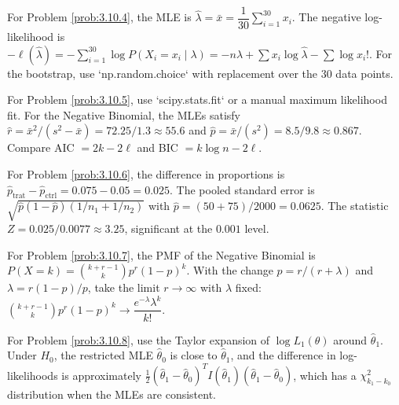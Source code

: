 \begin{sugerencia}
	\label{sug:3.10.4}
	For Problem \ref{prob:3.10.4}, the MLE is $\hat{\lambda} = \bar{x} = \dfrac{1}{30}\sum_{i=1}^{30} x_{i}$. The negative log-likelihood is $-\ell(\hat{\lambda}) = -\sum_{i=1}^{30}\log P(X_{i} = x_{i} \mid \lambda) = -n\hat{\lambda} + \sum x_{i} \log \hat{\lambda} - \sum \log x_{i}!$. For the bootstrap, use `np.random.choice` with replacement over the 30 data points.
\end{sugerencia}

\begin{sugerencia}
	\label{sug:3.10.5}
	For Problem \ref{prob:3.10.5}, use `scipy.stats.fit` or a manual maximum likelihood fit. For the Negative Binomial, the MLEs satisfy $\hat{r} = \bar{x}^{2}/(s^{2} - \bar{x}) = 72.25/1.3 \approx 55.6$ and $\hat{p} = \bar{x}/(s^{2}) = 8.5/9.8 \approx 0.867$. Compare AIC $= 2k - 2\ell$ and BIC $= k \log n - 2\ell$.
\end{sugerencia}

\begin{sugerencia}
	\label{sug:3.10.6}
	For Problem \ref{prob:3.10.6}, the difference in proportions is $\hat{p}_{\text{trat}} - \hat{p}_{\text{ctrl}} = 0.075 - 0.05 = 0.025$. The pooled standard error is $\sqrt{\hat{p}(1-\hat{p})(1/n_{1} + 1/n_{2})}$ with $\hat{p} = (50 + 75)/2000 = 0.0625$. The statistic $Z = 0.025/0.0077 \approx 3.25$, significant at the $0.001$ level.
\end{sugerencia}

\begin{sugerencia}
	\label{sug:3.10.7}
	For Problem \ref{prob:3.10.7}, the PMF of the Negative Binomial is $P(X = k) = \binom{k + r - 1}{k} p^{r}(1-p)^{k}$. With the change $p = r/(r + \lambda)$ and $\lambda = r(1-p)/p$, take the limit $r \to \infty$ with $\lambda$ fixed: $\binom{k+r-1}{k} p^{r} (1-p)^{k} \to \dfrac{e^{-\lambda} \lambda^{k}}{k!}$.
\end{sugerencia}

\begin{sugerencia}
	\label{sug:3.10.8}
	For Problem \ref{prob:3.10.8}, use the Taylor expansion of $\log L_{1}(\theta)$ around $\hat{\theta}_{1}$. Under $H_{0}$, the restricted MLE $\hat{\theta}_{0}$ is close to $\hat{\theta}_{1}$, and the difference in log-likelihoods is approximately $\frac{1}{2}(\hat{\theta}_{1} - \hat{\theta}_{0})^{T} I(\hat{\theta}_{1}) (\hat{\theta}_{1} - \hat{\theta}_{0})$, which has a $\chi^{2}_{k_{1} - k_{0}}$ distribution when the MLEs are consistent.
\end{sugerencia}

